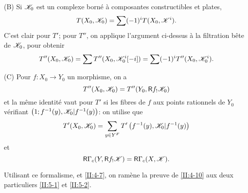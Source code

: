 (B) Si $\mathscr{K}_0$ est un complexe born\'e \`a composantes constructibles et plates, 
\[
  T(X_0,\mathscr{K}_0) = \sum (-1)^i T(X_0,\mathscr{K}^i) \text{.}
\]
C'est clair pour $T'$; pour $T''$, on applique l'argument ci-dessus \`a la 
filtration b\^ete de $\mathscr{K}_0$, pour obtenir 
\[
  T''(X_0,\mathscr{K}_0) = \sum T''(X_0,\mathscr{K}_0^i[-i]) = \sum (-1)^i T''(X_0,\mathscr{K}_0^i) \text{.}
\]

(C) Pour $f:X_0\to Y_0$ un morphisme, on a 
\[
  T''(X_0,\mathscr{K}_0) = T''(Y_0,\mathsf{R} f_! \mathscr{K}_0)
\]
et la m\^eme identit\'e vaut pour $T'$ si les fibres de $f$ aux points 
rationnels de $Y_0$ v\'erifiant $\left(1;f^{-1}(y),\mathscr{K}_0|f^{-1}(y)\right)$: on 
utilise que 
\[
  T'(X_0,\mathscr{K}_0) = \sum_{y\in Y^F} T'\left(f^{-1}(y), \mathscr{K}_0|f^{-1}(y)\right)
\]
et 
\[
  \mathsf{R}\Gamma_c(Y, \mathsf{R} f_! \mathscr{K}) = \mathsf{R}\Gamma_c(X,\mathscr{K}) \text{.}
\]

Utilisant ce formalisme, et \ref{II:4-7}, on ram\`ene la preuve de \ref{II:4-10} 
aux deux particuliers \ref{II:5-1} et \ref{II:5-2}. 

